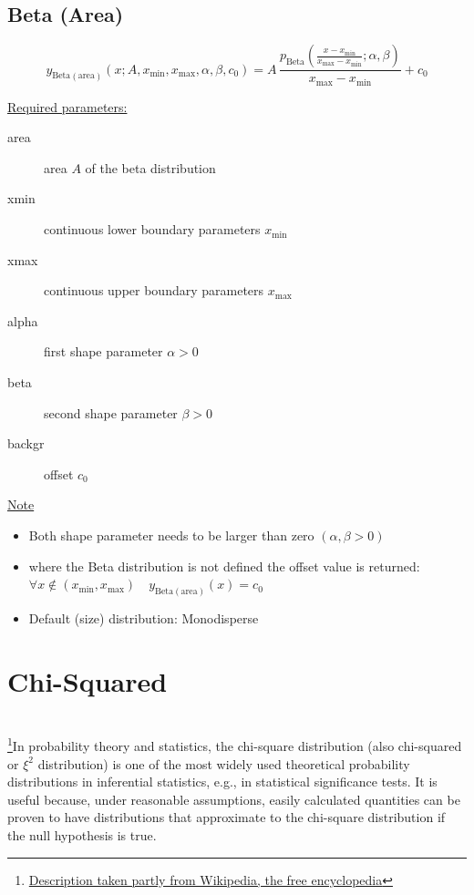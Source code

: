\subsection{Beta (Area)}\hspace{1pt}
\label{sec:BetaArea}

\begin{equation}
y_\mathrm{Beta (area)}\left(x;A,x_\mathrm{min},x_\mathrm{max},\alpha,\beta,c_0\right)
= A\, \frac{p_\mathrm{Beta}\left(\frac{x-x_\mathrm{min}}{x_\mathrm{max}-x_\mathrm{min}};\alpha,\beta\right)}{x_\mathrm{max}-x_\mathrm{min}}
+c_0
\end{equation}

\uline{Required parameters:}
\begin{description}
    \item[area] area $A$ of the beta distribution
    \item[xmin] continuous lower boundary parameters $x_\mathrm{min}$
    \item[xmax] continuous upper boundary parameters $x_\mathrm{max}$
    \item[alpha] first shape parameter $\alpha>0$
    \item[beta]  second shape parameter $\beta>0$
    \item[backgr] offset $c_0$
\end{description}

\uline{Note}
\begin{itemize}
  \item Both shape parameter needs to be larger than zero $(\alpha,\beta>0)$
  \item where the Beta distribution is not defined the offset value is returned: \\
  $\forall x\notin (x_\mathrm{min},x_\mathrm{max})\quad y_\mathrm{Beta (area)}(x) = c_0$
  \item Default (size) distribution: Monodisperse
\end{itemize}


\clearpage
\section{Chi-Squared} \hspace{1pt} \\
\label{sec:ChiSquared}
\footnote{\href{http://en.wikipedia.org/wiki/Chi-square_distribution}{Description
taken partly from Wikipedia, the free encyclopedia}}In probability
theory and statistics, the chi-square distribution (also chi-squared
or $\xi^2$  distribution) is one of the most widely used theoretical
probability distributions in inferential statistics, e.g., in
statistical significance tests. It is useful because, under
reasonable assumptions, easily calculated quantities can be proven
to have distributions that approximate to the chi-square
distribution if the null hypothesis is true.

